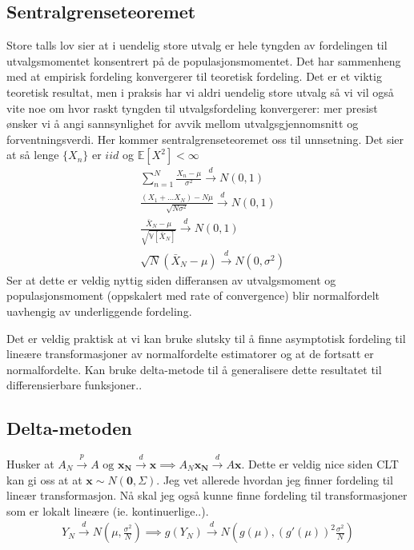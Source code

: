 \subsection{Sentralgrenseteoremet}
Store talls lov sier at i uendelig store utvalg er hele tyngden av fordelingen til utvalgsmomentet konsentrert på de populasjonsmomentet. Det har sammenheng med at empirisk fordeling konvergerer til teoretisk fordeling. Det er et viktig teoretisk resultat, men i praksis har vi aldri uendelig store utvalg så vi vil også vite noe om hvor raskt tyngden til utvalgsfordeling konvergerer: mer presist ønsker vi å angi sannsynlighet for avvik mellom utvalgsgjennomsnitt og forventningsverdi. Her kommer sentralgrenseteoremet oss til unnsetning. Det sier at så lenge $\{X_n\}$ er $iid$ og $\mathbb{E}[X^2] < \infty$
\begin{align}
&\sum_{n=1}^N \frac{X_n-\mu}{\sigma^2} \overset{d}{\rightarrow} N(0,1) \\ 
&\frac{(X_1+\dots X_N)-N\mu}{\sqrt{N\sigma^2}} \overset{d}{\rightarrow} N(0,1) \\
&\frac{\bar{X}_N-\mu}{\sqrt{\mathbb{V}[\bar{X}_N]}} \overset{d}{\rightarrow} N(0,1) \\
&\sqrt{N}(\bar{X}_N-\mu) \overset{d}{\rightarrow} N(0,\sigma^2) 
\end{align}
Ser at dette er veldig nyttig siden differansen av utvalgsmoment og populasjonsmoment (oppskalert med rate of convergence) blir normalfordelt uavhengig av underliggende fordeling. 

Det er veldig praktisk at vi kan bruke slutsky til å finne asymptotisk fordeling til lineære transformasjoner av normalfordelte estimatorer og at de fortsatt er normalfordelte. Kan bruke delta-metode til å generalisere dette resultatet til differensierbare funksjoner..
\subsection{Delta-metoden}
Husker at $A_N\overset{p}{\rightarrow} A \text{ og } \mathbf{x_N} \overset{d}{\rightarrow} \mathbf{x} \implies A_N\mathbf{x_N} \overset{d}{\rightarrow} A\mathbf{x}$. Dette er veldig nice siden CLT kan gi oss at at $\mathbf{x} \sim N(\mathbf{0},\Sigma)$. Jeg vet allerede hvordan jeg finner fordeling til lineær transformasjon. Nå skal jeg også kunne finne fordeling til transformasjoner som er lokalt lineære (ie. kontinuerlige..).
\begin{align}
Y_N \overset{d}{\rightarrow} N(\mu, \frac{\sigma^2}{N}) \implies g(Y_N) \overset{d}{\rightarrow} N\left(g(\mu),(g'(\mu))^2\frac{\sigma^2}{N}\right)
\end{align}
